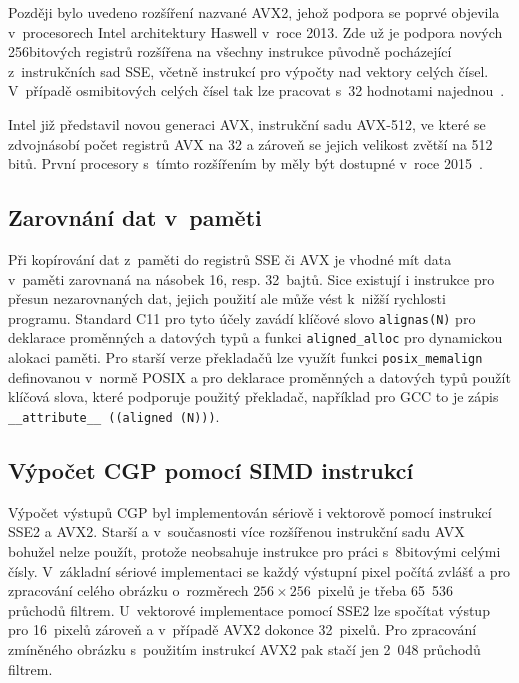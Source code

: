 Později bylo uvedeno rozšíření nazvané AVX2, jehož podpora se poprvé objevila v~procesorech Intel architektury Haswell v~roce 2013. Zde už je podpora nových 256bitových registrů rozšířena na všechny instrukce původně pocházející z~instrukčních sad SSE, včetně instrukcí pro výpočty nad vektory celých čísel. V~případě osmibitových celých čísel tak lze pracovat s~32 hodnotami najednou~\cite{IntelAVXReference}.

Intel již představil novou generaci AVX, instrukční sadu AVX-512, ve které se zdvojnásobí počet registrů AVX na 32 a zároveň se jejich velikost zvětší na 512 bitů. První procesory s~tímto rozšířením by měly být dostupné v~roce 2015~\cite{IntelAvx512}.

\subsection{Zarovnání dat v~paměti}

Při kopírování dat z~paměti do registrů SSE či AVX je vhodné mít data v~paměti zarovnaná na násobek 16, resp. 32~bajtů. Sice existují i instrukce pro přesun nezarovnaných dat, jejich použití ale může vést k~nižší rychlosti programu. Standard C11 pro tyto účely zavádí klíčové slovo \texttt{alignas(N)} pro deklarace proměnných a datových typů a funkci \texttt{aligned\_alloc} pro dynamickou alokaci paměti. Pro starší verze překladačů lze využít funkci \texttt{posix\_memalign} definovanou v~normě POSIX a pro deklarace proměnných a datových typů použít klíčová slova, které podporuje použitý překladač, například pro GCC to je zápis \texttt{\_\_attribute\_\_~((aligned~(N)))}.

\subsection{Výpočet CGP pomocí SIMD instrukcí}

Výpočet výstupů CGP byl implementován sériově i vektorově pomocí instrukcí SSE2 a AVX2. Starší a v~současnosti více rozšířenou instrukční sadu AVX bohužel nelze použít, protože neobsahuje instrukce pro práci s~8bitovými celými čísly. V~základní sériové implementaci se každý výstupní pixel počítá zvlášť a pro zpracování celého obrázku o~rozměrech $256\times256$~pixelů je třeba 65~536 průchodů filtrem. U~vektorové implementace pomocí SSE2 lze spočítat výstup pro 16~pixelů zároveň a v~případě AVX2 dokonce 32~pixelů. Pro zpracování zmíněného obrázku s~použitím instrukcí AVX2 pak stačí jen 2~048 průchodů filtrem.

